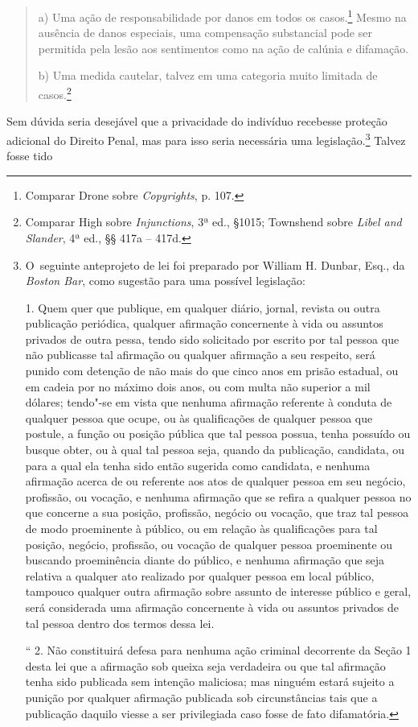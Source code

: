 \begin{quote}
a) Uma ação de responsabilidade por danos em todos os casos.\footnote{Comparar
  Drone sobre \emph{Copyrights}, p. 107.} Mesmo na ausência de danos
especiais, uma compensação substancial pode ser permitida pela lesão aos
sentimentos como na ação de calúnia e difamação.

\smallskip
\noindent
b) Uma medida cautelar, talvez em uma categoria muito limitada de
casos.\footnote{Comparar High sobre \emph{Injunctions}, 3ª ed., §1015;
  Townshend sobre \emph{Libel and Slander}, 4ª ed., §§ 417a -- 417d.}
\end{quote}

Sem dúvida seria desejável que a privacidade do indivíduo recebesse
proteção adicional do Direito Penal, mas para isso seria necessária uma
legislação.\footnote{O~seguinte anteprojeto de lei foi preparado por
  William H. Dunbar, Esq., da \emph{Boston Bar}, como sugestão para uma
  possível legislação:

   1. Quem quer que publique, em qualquer diário, jornal, revista
  ou outra publicação periódica, qualquer afirmação concernente à vida
  ou assuntos privados de outra pessa, tendo sido solicitado por escrito
  por tal pessoa que não publicasse tal afirmação ou qualquer afirmação
  a seu respeito, será punido com detenção de não mais do que cinco anos
  em prisão estadual, ou em cadeia por no máximo dois anos, ou com multa
  não superior a mil dólares; tendo"-se em vista que nenhuma afirmação
  referente à conduta de qualquer pessoa que ocupe, ou às qualificações
  de qualquer pessoa que postule, a função ou posição pública que tal
  pessoa possua, tenha possuído ou busque obter, ou à qual tal pessoa
  seja, quando da publicação, candidata, ou para a qual ela tenha sido
  então sugerida como candidata, e nenhuma afirmação acerca de ou
  referente aos atos de qualquer pessoa em seu negócio, profissão, ou
  vocação, e nenhuma afirmação que se refira a qualquer pessoa no que
  concerne a sua posição, profissão, negócio ou vocação, que traz tal
  pessoa de modo proeminente à público, ou em relação às qualificações
  para tal posição, negócio, profissão, ou vocação de qualquer pessoa
  proeminente ou buscando proeminência diante do público, e nenhuma
  afirmação que seja relativa a qualquer ato realizado por qualquer
  pessoa em local público, tampouco qualquer outra afirmação sobre
  assunto de interesse público e geral, será considerada uma afirmação
  concernente à vida ou assuntos privados de tal pessoa dentro dos
  termos dessa lei.

  `` 2. Não constituirá defesa para nenhuma ação criminal
  decorrente da Seção 1 desta lei que a afirmação sob queixa seja
  verdadeira ou que tal afirmação tenha sido publicada sem intenção
  maliciosa; mas ninguém estará sujeito a punição por qualquer afirmação
  publicada sob circunstâncias tais que a publicação daquilo viesse a
  ser privilegiada caso fosse de fato difamatória.} Talvez fosse tido
